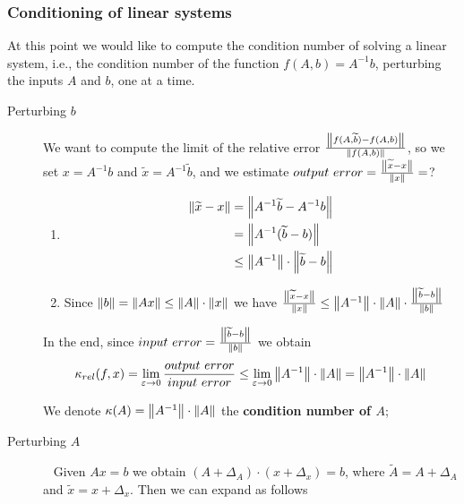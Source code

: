 \documentclass[computationalMathematics.tex]{subfiles}
\begin{document}
\subsubsection{Conditioning of linear systems}
At this point we would like to compute the condition number of solving a linear system, i.e., the condition number of the function $f(A,b)=A^{-1}b$, perturbing the inputs $A$ and $b$, one at a time.

\begin{description}
  \item[{\sc Perturbing} $b$] We want to compute the limit of the relative error $\frac{\left\lVert f(A, \widetilde{b}) - f(A, b)\right\rVert}{\left\lVert f(A, b)\right\rVert}$, so we set $x=A^{-1}b$ and $\tilde{x}=A^{-1}\tilde{b}$, and we estimate $output ~ error = \frac{\left\lVert\widetilde{x}-x\right\rVert}{\left\lVert x\right\rVert} =$?
    \begin{enumerate}
        \item \begin{equation}
          \begin{aligned}
            \left\lVert\widetilde{x} - x\right\rVert &= \left\lVert{A}^{-1} \widetilde{b} - {A}^{-1} b\right\rVert\\
            &= \left\lVert{A}^{-1} (\widetilde{b} - b)\right\rVert\\
            &\le \left\lVert{A}^{-1}\right\rVert \cdot \left\lVert\widetilde{b} - b\right\rVert\\
          \end{aligned}
          \end{equation}
        \item Since $\left\lVert b\right\rVert = \left\lVert Ax\right\rVert \le \left\lVert A\right\rVert \cdot \left\lVert x\right\rVert$ we have
          $\frac{\left\lVert\widetilde{x} - x\right\rVert}{\left\lVert x\right\rVert} \le \left\lVert{A}^{-1}\right\rVert \cdot \left\lVert A\right\rVert \cdot \frac{\left\lVert\widetilde{b} - b\right\rVert}{\left\lVert b\right\rVert}$
    \end{enumerate}
    In the end, since $input ~ error = \frac{\left\lVert\widetilde{b} - b\right\rVert}{\left\lVert b\right\rVert}$ we obtain 
    \[
      \kappa_{rel} (f, x) = \lim\limits_{\varepsilon \rightarrow 0} \frac{output ~ error}{input ~ error} \le \lim\limits_{\varepsilon \rightarrow 0} \left\lVert{A}^{-1}\right\rVert \cdot \left\lVert A\right\rVert = \left\lVert{A}^{-1}\right\rVert \cdot \left\lVert A\right\rVert
    \]
    
    We denote $\kappa(A) = \left\lVert{A}^{-1}\right\rVert \cdot \left\lVert A\right\rVert$ the \textbf{condition number of $A$};

  \item[{\sc Perturbing} $A$]~%
    Given $Ax=b$ we obtain $(A+\Delta_A) \cdot (x + \Delta_x)= b$, where $\widetilde{A} = A + \Delta_A$ and $\widetilde{x} = x + \Delta_x$. Then we can expand as follows


\end{description}
\end{document}
